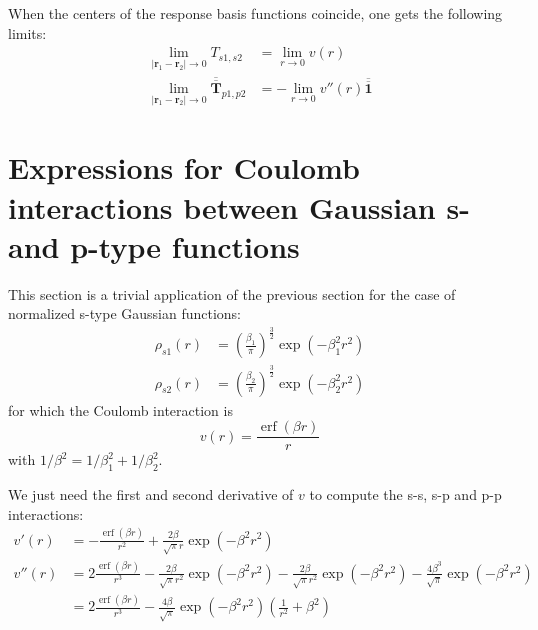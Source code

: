 \documentclass[a4paper,12pt,parskip=half]{scrartcl}
\newcommand*{\tensor}[1]{\overline{\overline{\mathbold{#1}}}}
\DeclareMathOperator{\erf}{erf}
\begin{document}
When the centers of the response basis functions coincide, one gets the following limits:
%
\begin{align}
    \lim_{|\mathbold{r}_1 - \mathbold{r}_2| \rightarrow 0} T_{s1,s2} &= \lim_{r\rightarrow 0} v(r) \\
    \lim_{|\mathbold{r}_1 - \mathbold{r}_2| \rightarrow 0} \tensor{T}_{p1,p2} &= -\lim_{r\rightarrow 0} v''(r) \tensor{1}
\end{align}


\section{Expressions for Coulomb interactions between Gaussian s- and p-type functions}

This section is a trivial application of the previous section for the case of normalized s-type Gaussian functions:
%
\begin{align}
    \rho_{s1}(r) &= \left(\frac{\beta_1}{\pi}\right)^{\frac{3}{2}} \exp(-\beta_1^2 r^2) \\
    \rho_{s2}(r) &= \left(\frac{\beta_2}{\pi}\right)^{\frac{3}{2}} \exp(-\beta_2^2 r^2)
\end{align}
%
for which the Coulomb interaction is
%
\begin{equation}
    \label{eq:ss_gauss}
    v(r) = \frac{\erf(\beta r)}{r}
\end{equation}
%
with $1/\beta^2 = 1/\beta_1^2 + 1/\beta_2^2$.

We just need the first and second derivative of $v$ to compute the s-s, s-p and p-p interactions:
%
\begin{align}
    v'(r) &= -\frac{\erf(\beta r)}{r^2} + \frac{2 \beta}{\sqrt{\pi} r} \exp(-\beta^2 r^2) \\
    \label{eq:pp_gauss}
    v''(r) &= 2\frac{\erf(\beta r)}{r^3} - \frac{2 \beta}{\sqrt{\pi} r^2} \exp(-\beta^2 r^2)
     -\frac{2 \beta}{\sqrt{\pi} r^2} \exp(-\beta^2 r^2) - \frac{4 \beta^3}{\sqrt{\pi}} \exp(-\beta^2 r^2)\\
           &= 2\frac{\erf(\beta r)}{r^3} - \frac{4 \beta}{\sqrt{\pi}} \exp(-\beta^2 r^2)
              \left( \frac{1}{r^2} + \beta^2 \right)
\end{align}
\end{document}
